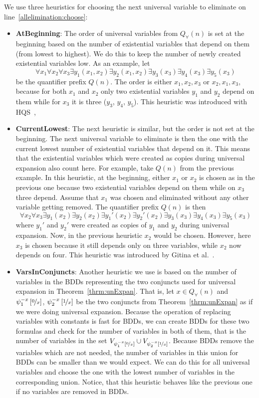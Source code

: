 \documentclass[
  digital, %
  color,
  twoside, %
  table,   %
  nolof,     %
  nolot,     %
]{fithesis3}
\theoremstyle{definition}
\theoremstyle{remark}
\newcommand{\substitute}[2]{\left[ \nicefrac{#2}{#1} \right]}
\newcommand{\vars}[1]{V_{#1}}
\newcommand{\prefix}[1]{Q({#1})}
\newcommand{\uprefix}[1]{Q_{\forall}(#1)}
\newcommand{\QUatbeginning}{\textbf{At\-Be\-gin\-ning}}
\newcommand{\QUcurrentlowest}{\textbf{CurrentLowest}}
\newcommand{\QUvarsinconjuncts}{\textbf{VarsInConjuncts}}
\begin{document}
We use three heuristics for choosing the next universal variable to eliminate on line~\ref{allelimination:choose}:
\begin{itemize}
    \item \QUatbeginning{}: The order of universal variables from $\uprefix{n}$ is set at the beginning based on the number of existential variables that depend on them (from lowest to highest). We do this to keep the number of newly created existential variables low. %
    As an example, let
    \[\forall x_1 \forall x_2 \forall x_3 \exists y_1(x_1, x_2) \exists y_2(x_1,x_2) \exists y_3(x_3) \exists y_4(x_3) \exists y_5 (x_3)\]
    be the quantifier prefix $\prefix{n}$. The order is either $x_1, x_2, x_3$ or $x_2, x_1, x_3$, because for both $x_1$ and $x_2$ only two existential variables $y_1$ and $y_2$ depend on them while for $x_3$ it is three ($y_3$, $y_4$, $y_5$). This heuristic was introduced with HQS~\cite{HQSquantifierElimination}, 
    \item \QUcurrentlowest{}: The next heuristic is similar, but the order is not set at the beginning. The next universal variable to eliminate is then the one with the current lowest number of existential variables that depend on it. This means that the existential variables which were created as copies during universal expansion also count here. For example, take $\prefix{n}$ from the previous example. In this heuristic, at the beginning, either $x_1$ or $x_2$ is chosen as in the previous one because two existential variables depend on them while on $x_3$ three depend. Assume that $x_1$ was chosen and eliminated without any other variable getting removed. The quantifier prefix $\prefix{n}$ is then
    \[\forall x_2 \forall x_3 \exists y_1(x_2) \exists y_2(x_2) \exists y_1'(x_2) \exists y_2'(x_2) \exists y_3(x_3) \exists y_4(x_3) \exists y_5 (x_3)\]
    where $y_1'$ and $y_2'$ were created as copies of $y_1$ and $y_2$ during universal expansion. Now, in the previous heuristic $x_2$ would be chosen. However, here $x_3$ is chosen because it still depends only on three variables, while $x_2$ now depends on four. This heuristic was introduced by Gitina et al.~\cite{HQSsimpleAlg}.
    \item \QUvarsinconjuncts{}: Another heuristic we use is based on the number of variables in the BDDs representing the two conjuncts used for universal expansion in Theorem~\ref{thrm:unExpan}. That is, let $x \in \uprefix{n}$ and $\psi_1^{-x}\substitute{x}{0}$, $\psi_2^{-x}\substitute{x}{1}$
    be the two conjuncts from Theorem~\ref{thrm:unExpan} as if we were doing universal expansion. Because the operation of replacing variables with constants is fast for BDDs, we can create BDDs for these two formulas and check for the number of variables in both of them, that is the number of variables in the set $\vars{\psi_1^{-x}\substitute{x}{0}} \cup \vars{\psi_2^{-x}\substitute{x}{1}}$. Because BDDs remove the variables which are not needed, the number of variables in this union for BDDs can be smaller than we would expect. We can do this for all universal variables and choose the one with the lowest number of variables in the corresponding union. Notice, that this heuristic behaves like the previous one if no variables are removed in BDDs.

\end{itemize}
\end{document}
